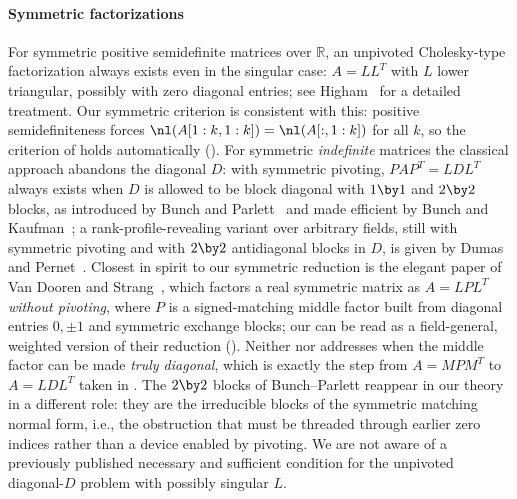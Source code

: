 \paragraph{Symmetric factorizations}
For symmetric positive semidefinite matrices over $\mathbb{R}$, an unpivoted
Cholesky-type factorization always exists even in the singular case: $A =
LL^T$ with $L$ lower triangular, possibly with zero diagonal entries; see
Higham~\cite{higham_cholesky_1990} for a detailed treatment.  Our symmetric
criterion is consistent with this: positive semidefiniteness forces
$\nl(A[1:k,1:k]) = \nl(A[:,1:k])$ for all $k$, so the criterion of
 holds automatically ().  For symmetric
\emph{indefinite} matrices the classical approach abandons the diagonal $D$:
with symmetric pivoting, $PAP^T = LDL^T$ always exists when $D$ is allowed
to be block diagonal with $1 \by 1$ and $2 \by 2$ blocks, as introduced by
Bunch and Parlett~\cite{bunch_parlett_1971} and made efficient by Bunch and
Kaufman~\cite{bunch_kaufman_1977}; a rank-profile-revealing variant over
arbitrary fields, still with symmetric pivoting and with $2 \by 2$
antidiagonal blocks in $D$, is given by Dumas and
Pernet~\cite{dumas_pernet_2018}.  Closest in spirit to our symmetric
reduction is the elegant paper of Van Dooren and
Strang~\cite{vandooren_strang_2014}, which factors a real symmetric matrix
as $A = L P L^T$ \emph{without pivoting}, where $P$ is a signed-matching
middle factor built from diagonal entries $0, \pm 1$ and symmetric exchange
blocks; our  can be read as a field-general,
weighted version of their reduction ().  Neither
\cite{vandooren_strang_2014} nor \cite{dumas_pernet_2018} addresses when
the middle factor can be made \emph{truly diagonal}, which is exactly the
step from $A = MPM^T$ to $A = LDL^T$ taken in
.  The $2 \by 2$ blocks of
Bunch--Parlett reappear in our theory in a different role: they are the
irreducible blocks of the symmetric matching normal form, i.e., the
obstruction that must be threaded through earlier zero indices rather than a
device enabled by pivoting.  We are not aware of a previously published
necessary and sufficient condition for the unpivoted diagonal-$D$ problem
with possibly singular $L$.

